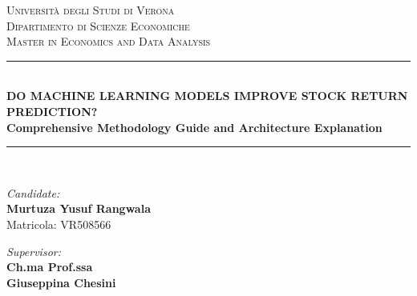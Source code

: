 \documentclass[11pt]{article}
\begin{document}
\begin{center}
    \textsc{\Large Università degli Studi di Verona} \\
    \vspace{0.2cm}
    \textsc{\large Dipartimento di Scienze Economiche} \\
    \vspace{0.2cm}
    \textsc{\small Master in Economics and Data Analysis} \\
    \vspace{0.5cm}
    \rule{\linewidth}{0.5mm} \\
    \vspace{0.3cm}
    {\Large \bfseries DO MACHINE LEARNING MODELS IMPROVE STOCK RETURN PREDICTION?} \\
    \vspace{0.2cm}
    {\large \bfseries Comprehensive Methodology Guide and Architecture Explanation} \\
    \vspace{0.2cm}
    \rule{\linewidth}{0.5mm} \\
    \vspace{0.8cm}
    
    \begin{minipage}[t]{0.45\textwidth}
        \begin{flushleft} \large
            \emph{Candidate:} \\
            \textbf{Murtuza Yusuf Rangwala} \\
            Matricola: VR508566
        \end{flushleft}
    \end{minipage}
    \hfill
    \begin{minipage}[t]{0.45\textwidth}
        \begin{flushright} \large
            \emph{Supervisor:} \\
            \textbf{Ch.ma Prof.ssa} \\
            \textbf{Giuseppina Chesini}
        \end{flushright}
    \end{minipage}
    \vspace{0.8cm}
\end{center}

\begin{abstract}
    This document provides a mathematically rigorous explanation of the empirical framework, data branches, and predictive architectures utilized in the master's thesis. We outline the 4-branch feature system spanning exactly 59 variables, detailing the data alignment and availability protocols. We present the formulations for the baseline econometric model (Fama-MacBeth OLS), a linear baseline (OLS using 59 features), baseline machine learning models (LSTM and XGBoost), and our custom network, the \textbf{Temporal Fusion Deep Multimodal Gated Attention Network (TFDMGA-TS)}. We present a detailed visual schema of the TFDMGA-TS architecture and articulate its research contributions.
\end{abstract}
\end{document}
